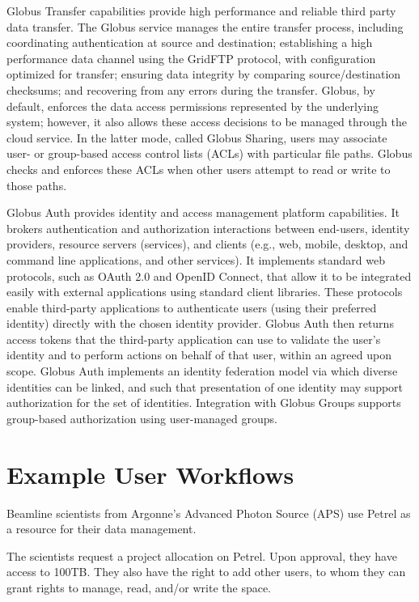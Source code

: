 \documentclass[sigconf]{acmart}
\begin{document}
Globus Transfer capabilities provide high performance and reliable third party data transfer. 
The Globus service manages the entire transfer process, including coordinating authentication at source and destination; establishing a high performance data channel using  the GridFTP protocol, with configuration optimized for transfer; ensuring data integrity by comparing source/destination checksums; and recovering from any errors during the transfer.  Globus, by default, enforces the data access permissions represented
by the underlying system; however, it also allows these access decisions to be managed through the cloud service. In the latter mode, called Globus Sharing, users may associate user- or group-based access control lists (ACLs) with particular file paths. Globus checks and enforces these ACLs when other users attempt to read or write to those paths.

Globus Auth provides identity and access management platform capabilities. It brokers authentication and authorization interactions between end-users, identity providers, resource servers (services), and clients (e.g., web, mobile, desktop, and command line applications, and other services). 
It implements standard web protocols, such as OAuth 2.0 and OpenID Connect, that allow it to be integrated easily with external applications using standard client libraries. 
These protocols enable third-party applications to authenticate users (using their preferred identity) directly with the chosen identity provider. Globus Auth then returns access
tokens that the third-party application can use to validate the user's identity and to perform actions on behalf of that user, within an agreed upon scope. Globus Auth implements an identity federation model via which diverse identities can be linked, and such that presentation of one identity may support authorization for the set of identities. Integration with Globus Groups supports group-based authorization using user-managed groups.



\section{Example User Workflows}

Beamline scientists from Argonne's Advanced Photon Source (APS) use Petrel as a resource for their data management.

The scientists request a project allocation on Petrel. 
Upon approval, they have access to 100TB. 
They also have the right to add other users, to whom they can grant rights to manage, read, and/or write the space.
\end{document}
